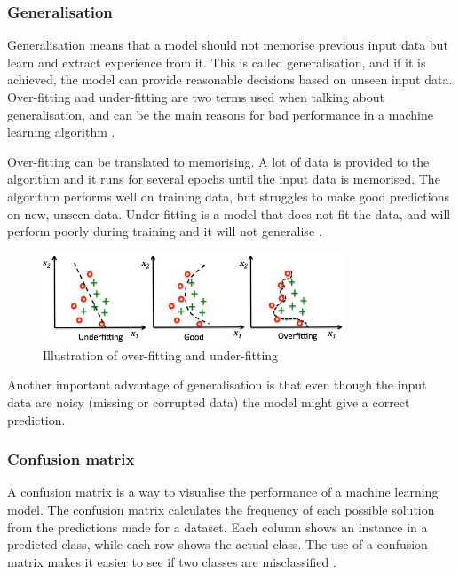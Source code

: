 \documentclass[english, a4paper]{report}
\begin{document}
{{{            \subsubsection{Generalisation}\label{generalization}
            {
                Generalisation means that a model should not memorise previous input data but learn and extract experience from it. This is called generalisation, and if it is achieved, the model can provide reasonable decisions based on unseen input data. Over-fitting and under-fitting are two terms used when talking about generalisation, and can be the main reasons for bad performance in a machine learning algorithm \cite{mlKelleher}.
                \par
                Over-fitting can be translated to memorising. A lot of data is provided to the algorithm and it runs for several epochs until the input data is memorised. The algorithm performs well on training data, but struggles to make good predictions on new, unseen data. Under-fitting is a model that does not fit the data, and will perform poorly during training and it will not generalise \cite{pythonML}. 
                \par
                
                \begin{figure}[H]
                    \centering \includegraphics[width=0.8\textwidth]{overunderfitting}
                    \caption{Illustration of over-fitting and under-fitting \cite{pythonML}}
                    \label{fig:overunderfitting}
                \end{figure}
                
                \par
                Another important advantage of generalisation is that even though the input data are noisy (missing or corrupted data) the model might give a correct prediction.
            }
            
            \subsubsection{Confusion matrix}
            {
                A confusion matrix is a way to visualise the performance of a machine learning model. The confusion matrix calculates the frequency of each possible solution from the predictions made for a dataset. Each column shows an instance in a predicted class, while each row shows the actual class. The use of a confusion matrix makes it easier to see if two classes are misclassified \cite{mlKelleher}.
                
}}}}
\end{document}
